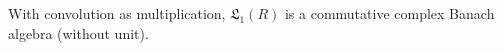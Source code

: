 With convolution as multiplication, $\mathfrak{L}_1(R)$ is a commutative complex Banach algebra (without unit).

